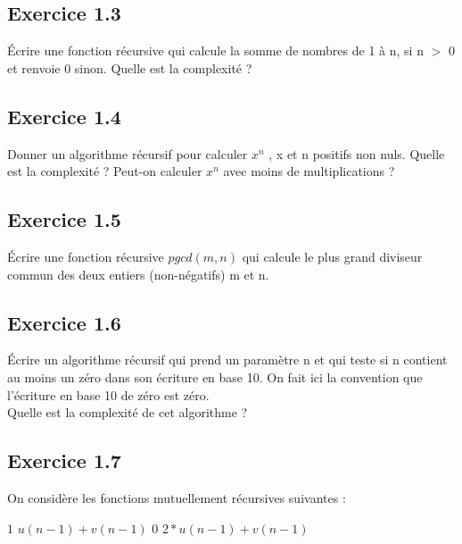\documentclass{article}[12pt]
\begin{document}
\subsection*{Exercice 1.3}

Écrire une fonction récursive qui calcule la somme de nombres de 1 à n, si n $>$ 0 et renvoie 0 sinon. 
Quelle est la complexité ?

\subsection*{Exercice 1.4}

Donner un algorithme récursif pour calculer $x^n$ , x et n positifs non nuls. Quelle est la
complexité ?
Peut-on calculer $x^n$ avec moins de multiplications ?

\subsection*{Exercice 1.5}

Écrire une fonction récursive $pgcd(m, n)$ qui calcule le plus grand diviseur commun des deux entiers (non-négatifs) m et n.


\subsection*{Exercice 1.6}

Écrire un algorithme récursif qui prend un paramètre n et qui teste si n contient au moins un zéro dans son écriture en base 10. On fait ici la convention que l’écriture en base 10 de zéro est zéro.\\
Quelle est la complexité de cet algorithme ?


\subsection*{Exercice 1.7}

On considère les fonctions mutuellement récursives suivantes :

\begin{tcolorbox}
        \begin{algorithmic}[1]
        \State{} $1$
    \Else
        \State{} $u(n - 1) + v(n - 1)$
    \EndIf
  \EndFunction
  \Statex
        \State{} $0$
    \Else
        \State{} $2 * u(n - 1) + v(n - 1)$
    \EndIf
  \EndFunction
  \end{algorithmic}

 \end{tcolorbox} 
\end{document}
